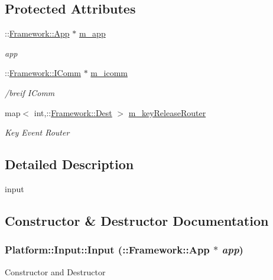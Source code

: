 \subsection*{Protected Attributes}
\begin{DoxyCompactItemize}
\item 
\hypertarget{classPlatform_1_1Input_af3f3494692e3ec1f251b067ebae344a4}{
::\hyperlink{classFramework_1_1App}{Framework::App} $\ast$ \hyperlink{classPlatform_1_1Input_af3f3494692e3ec1f251b067ebae344a4}{m\_\-app}}
\label{classPlatform_1_1Input_af3f3494692e3ec1f251b067ebae344a4}

\begin{DoxyCompactList}\small\item\em app \item\end{DoxyCompactList}\item 
\hypertarget{classPlatform_1_1Input_ae336873bad1336bc555c3127940fab27}{
::\hyperlink{classFramework_1_1IComm}{Framework::IComm} $\ast$ \hyperlink{classPlatform_1_1Input_ae336873bad1336bc555c3127940fab27}{m\_\-icomm}}
\label{classPlatform_1_1Input_ae336873bad1336bc555c3127940fab27}

\begin{DoxyCompactList}\small\item\em /breif IComm \item\end{DoxyCompactList}\item 
\hypertarget{classPlatform_1_1Input_ac3bcd5364f46fcdde7554f977e013756}{
map$<$ int,::\hyperlink{structFramework_1_1Dest}{Framework::Dest} $>$ \hyperlink{classPlatform_1_1Input_ac3bcd5364f46fcdde7554f977e013756}{m\_\-keyReleaseRouter}}
\label{classPlatform_1_1Input_ac3bcd5364f46fcdde7554f977e013756}

\begin{DoxyCompactList}\small\item\em Key Event Router \item\end{DoxyCompactList}\end{DoxyCompactItemize}


\subsection{Detailed Description}
input 

\subsection{Constructor \& Destructor Documentation}
\hypertarget{classPlatform_1_1Input_a6c2cb78acadfb023bbf1b4646423d87e}{
\subsubsection[{Input}]{\setlength{\rightskip}{0pt plus 5cm}Platform::Input::Input (::{\bf Framework::App} $\ast$ {\em app})}}
\label{classPlatform_1_1Input_a6c2cb78acadfb023bbf1b4646423d87e}
Constructor and Destructor

